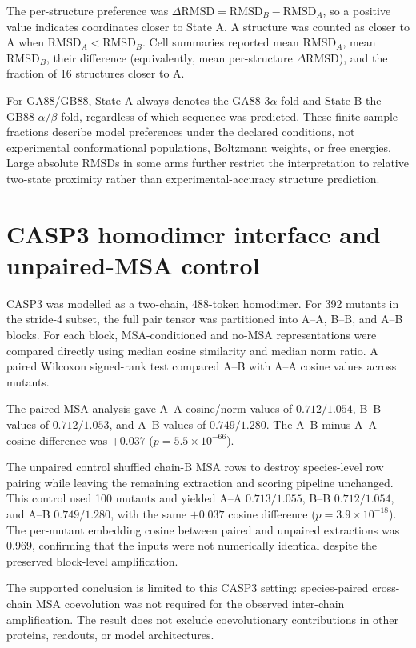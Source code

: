 \documentclass[10pt,a4paper]{article}
\begin{document}
The per-structure preference was $\Delta\mathrm{RMSD}=\mathrm{RMSD}_B-\mathrm{RMSD}_A$, so a positive value indicates coordinates closer to State A. A structure was counted as closer to A when $\mathrm{RMSD}_A<\mathrm{RMSD}_B$. Cell summaries reported mean $\mathrm{RMSD}_A$, mean $\mathrm{RMSD}_B$, their difference (equivalently, mean per-structure $\Delta\mathrm{RMSD}$), and the fraction of 16 structures closer to A.

For GA88/GB88, State A always denotes the GA88 $3\alpha$ fold and State B the GB88 $\alpha/\beta$ fold, regardless of which sequence was predicted. These finite-sample fractions describe model preferences under the declared conditions, not experimental conformational populations, Boltzmann weights, or free energies. Large absolute RMSDs in some arms further restrict the interpretation to relative two-state proximity rather than experimental-accuracy structure prediction.

\section{CASP3 homodimer interface and unpaired-MSA control}

CASP3 was modelled as a two-chain, 488-token homodimer. For 392 mutants in the stride-4 subset, the full pair tensor was partitioned into A--A, B--B, and A--B blocks. For each block, MSA-conditioned and no-MSA representations were compared directly using median cosine similarity and median norm ratio. A paired Wilcoxon signed-rank test compared A--B with A--A cosine values across mutants.

The paired-MSA analysis gave A--A cosine/norm values of $0.712/1.054$, B--B values of $0.712/1.053$, and A--B values of $0.749/1.280$. The A--B minus A--A cosine difference was $+0.037$ ($p=5.5\times10^{-66}$).

The unpaired control shuffled chain-B MSA rows to destroy species-level row pairing while leaving the remaining extraction and scoring pipeline unchanged. This control used 100 mutants and yielded A--A $0.713/1.055$, B--B $0.712/1.054$, and A--B $0.749/1.280$, with the same $+0.037$ cosine difference ($p=3.9\times10^{-18}$). The per-mutant embedding cosine between paired and unpaired extractions was 0.969, confirming that the inputs were not numerically identical despite the preserved block-level amplification.

The supported conclusion is limited to this CASP3 setting: species-paired cross-chain MSA coevolution was not required for the observed inter-chain amplification. The result does not exclude coevolutionary contributions in other proteins, readouts, or model architectures.
\end{document}
